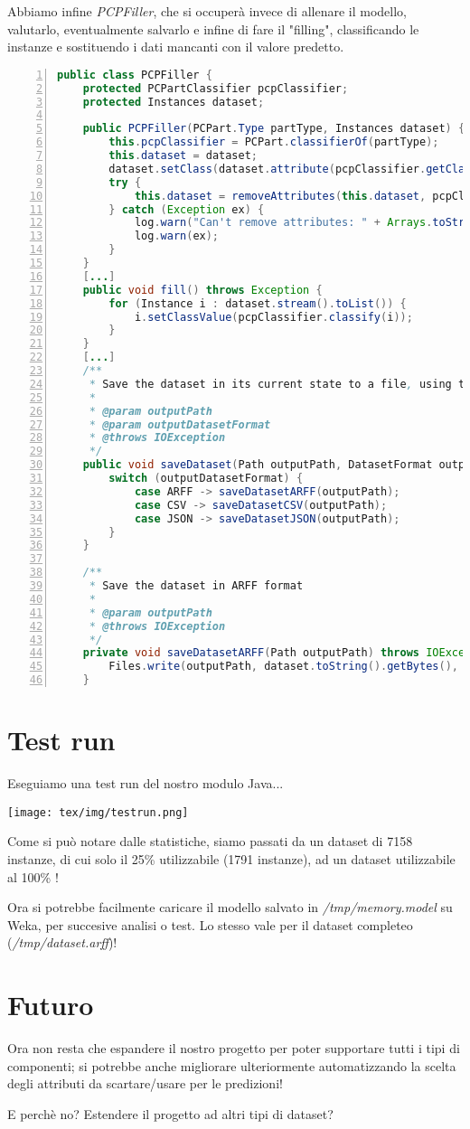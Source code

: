 \documentclass[12pt]{report}
\begin{document}
Abbiamo infine \textit{PCPFiller}, che si occuperà invece di allenare il modello,
valutarlo, eventualmente salvarlo e infine di fare il "filling", classificando
le instanze e sostituendo i dati mancanti con il valore predetto.
\begin{lstlisting}[language=Java, numbers=left, basicstyle=\scriptsize\ttfamily, breaklines=true]
public class PCPFiller {
	protected PCPartClassifier pcpClassifier;
	protected Instances dataset;

	public PCPFiller(PCPart.Type partType, Instances dataset) {
		this.pcpClassifier = PCPart.classifierOf(partType);
		this.dataset = dataset;
		dataset.setClass(dataset.attribute(pcpClassifier.getClassName()));
		try {
			this.dataset = removeAttributes(this.dataset, pcpClassifier.getAttributesToIgnore());
		} catch (Exception ex) {
			log.warn("Can't remove attributes: " + Arrays.toString(pcpClassifier.getAttributesToIgnore()));
			log.warn(ex);
		}
	}
	[...]
	public void fill() throws Exception {
		for (Instance i : dataset.stream().toList()) {
			i.setClassValue(pcpClassifier.classify(i));
		}
	}
	[...]
	/**
	 * Save the dataset in its current state to a file, using the specified format
	 *
	 * @param outputPath
	 * @param outputDatasetFormat
	 * @throws IOException
	 */
	public void saveDataset(Path outputPath, DatasetFormat outputDatasetFormat) throws IOException {
		switch (outputDatasetFormat) {
			case ARFF -> saveDatasetARFF(outputPath);
			case CSV -> saveDatasetCSV(outputPath);
			case JSON -> saveDatasetJSON(outputPath);
		}
	}

	/**
	 * Save the dataset in ARFF format
	 *
	 * @param outputPath
	 * @throws IOException
	 */
	private void saveDatasetARFF(Path outputPath) throws IOException {
		Files.write(outputPath, dataset.toString().getBytes(), StandardOpenOption.CREATE);
	}
\end{lstlisting}

\newpage
\section{Test run}

Eseguiamo una test run del nostro modulo Java...

\texttt{[image: tex/img/testrun.png]}

Come si può notare dalle statistiche, siamo passati da un dataset di 7158 instanze, di cui solo
il 25\% utilizzabile (1791 instanze), ad un dataset utilizzabile al 100\% !

Ora si potrebbe facilmente caricare il modello salvato in \textit{/tmp/memory.model} su Weka,
per succesive analisi o test.
Lo stesso vale per il dataset completeo (\textit{/tmp/dataset.arff})!

\section{Futuro}

Ora non resta che espandere il nostro progetto per poter supportare tutti i tipi di componenti;
si potrebbe anche migliorare ulteriormente automatizzando la scelta degli attributi da scartare/usare
per le predizioni!

E perchè no? Estendere il progetto ad altri tipi di dataset?
\end{document}
